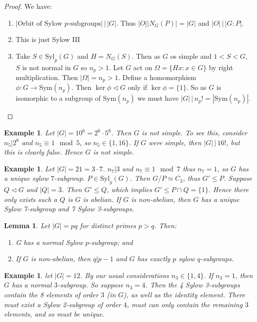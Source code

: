 \documentclass[a4paper,10pt]{article}
\newtheorem{eg}[thm]{Example}
\newtheorem{Lem}[thm]{Lemma}
\begin{document}
\begin{proof}
We have:
\begin{enumerate}
\item $|\text{Orbit of Sylow }p\text{-subgroups}| \, \big| \, |G|$. Thus $|O| |N_G(P)| = |G|$ and $|O| \, \big| \, |G:P|$.
\item This is just Sylow III
\item Take $S \in \text{Syl}_p(G)$ and $H = N_G(S)$. Then as $G$ os simple and $1 < S < G$, $S$ is not normal in $G$ so $n_p > 1$. Let $G$ act on $\Omega = \{ Hx : x \in G \}$ by right multiplication. Then $|\Omega| = n_p > 1$. Define a homomorphism $\phi : G \rightarrow \text{Sym}(n_p)$. Then $\ker \phi \triangleleft G$ only if $\ker \phi = \{1\}$. So as $G$ is isomorphic to a subgroup of $\text{Sym}(n_p)$ we must have $|G| \, \big| \, n_p! = |\text{Sym}(n_p)|$. 
\end{enumerate}
\end{proof}

\begin{eg}
Let $|G| = 10^6 = 2^6 \cdot 5^6$. Then $G$ is not simple. To see this, consider $n_5 | 2^6$ and $n_5 \equiv 1 \mod 5$, so $n_5 \in \{1, 16\}$. If $G$ were simple, then $|G| \, \big| \, 16!$, but this is clearly false. Hence $G$ is not simple. 
\end{eg}

\begin{eg}
Let $|G| = 21 = 3 \cdot 7$. $n_7 | 3$ and $n_7 \equiv 1 \mod 7$ thus $n_7 = 1$, so $G$ has a unique sylow $7$-subgroup. $P \in \text{Syl}_y(G)$. Then $G / P \simeq C_3$, thus $G' \leq P$. Suppose $Q \triangleleft G$ and $|Q| = 3$. Then $G' \leq Q$, which implies $G' \leq P \cap Q = \{1\}$. Hence there only exists such a $Q$ is $G$ is abelian. If $G$ is non-abelian, then $G$ has a unique Sylow 7-subgroup and 7 Sylow 3-subgroups. 
\end{eg}

\begin{Lem}
Let $|G| = pq$ for distinct primes $p > q$. Then:
\begin{enumerate}
\item G has a normal Sylow $p$-subgroup; and
\item If $G$ is non-abelian, then $q | p -1$ and $G$ has exactly $p$ sylow $q$-subgroups.
\end{enumerate}
\end{Lem}

\begin{eg}
let $|G| = 12$. By our usual considerations $n_3 \in \{1,4\}$. If $n_3 = 1$, then $G$ has a normal $3$-subgroup. So suppose $n_3 = 4$. Then the 4 Sylow 3-subgroups contain the 8 elements of order $3$ (in $G$), as well as the identity element. There must exist a Sylow 2-subgroup of order $4$, must can only contain the remaining $3$ elements, and so must be unique. 
\end{eg}
\end{document}
